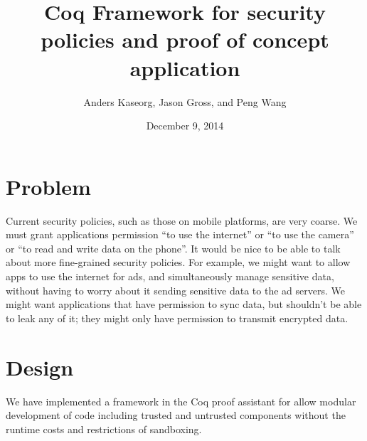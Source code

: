 \documentclass{article}
\title{Coq Framework for security policies and proof of concept application}
\author{Anders Kaseorg, Jason Gross, and Peng Wang}
\date{December 9, 2014}
\begin{document}
\maketitle
\section{Problem}
Current security policies, such as those on mobile platforms, are very coarse.  We must grant applications permission ``to use the internet'' or ``to use the camera'' or ``to read and write data on the phone''.  It would be nice to be able to talk about more fine-grained security policies.  For example, we might want to allow apps to use the internet for ads, and simultaneously manage sensitive data, without having to worry about it sending sensitive data to the ad servers.  We might want applications that have permission to sync data, but shouldn't be able to leak any of it; they might only have permission to transmit encrypted data.


\section{Design}
We have implemented a framework in the Coq proof assistant for allow modular development of code including trusted and untrusted components without the runtime costs and restrictions of sandboxing.
\end{document}
